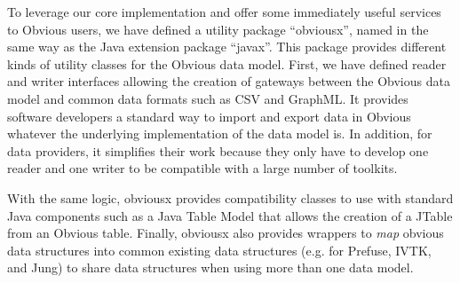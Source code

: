 To leverage our core implementation and offer some immediately useful
services to Obvious users, we have defined a utility package
``obviousx'', named in the same way as the Java extension package
``javax''.  This package provides different kinds of utility classes
for the Obvious data model.  First, we have defined reader and writer
interfaces allowing the creation of gateways between the Obvious data
model and common data formats such as CSV and GraphML.  It provides
software developers a standard way to import and export data in
Obvious whatever the underlying implementation of the data model
is.  In addition, for data providers, it simplifies their work because
they only have to develop one reader and one writer to be compatible
with a large number of toolkits.

With the same logic, obviousx provides compatibility classes to use
with standard Java components such as a Java Table Model that allows
the creation of a JTable from an Obvious table.  Finally, obviousx
also provides wrappers to \emph{map} obvious data structures into
common existing data structures (e.g. for Prefuse, IVTK, and Jung) to
share data structures when using more than one data model.

